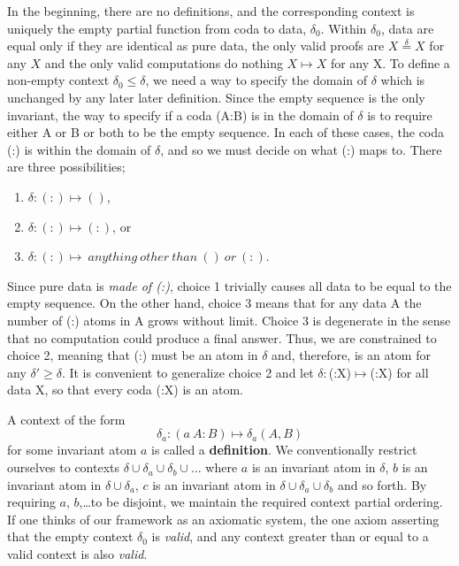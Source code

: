 \documentclass[11pt]{article}
\begin{document}
     In the beginning, there are no definitions, and the corresponding context is uniquely the empty partial function from coda to data, $\delta_0$.
 Within $\delta_0$, data are equal only if they are identical as 
 pure data, the only valid proofs are $X{\overset \delta =}X$ for any $X$ and the only valid computations do nothing $X\mapsto X$ for any X. 
To define a non-empty context $\delta_0\le\delta$, we need a way to specify the domain of $\delta$ which is unchanged by any later  
later definition.  Since the empty sequence is the only invariant, the way to specify if a coda (A:B) is in the domain of $\delta$ is 
to require either A or B or both to be the empty sequence. In each of these cases, the coda (:) is within the domain of $\delta$, and so we must decide on what (:) maps to.  
There are three possibilities; 
\begin{enumerate}
\item{$\delta: (:) \mapsto ()$},
\item{$\delta: (:) \mapsto (:)$}, or 
\item{$\delta: (:) \mapsto \ anything\ other\ than\ ()\ or\ (:)$}. 
\end{enumerate}
Since pure data is {\it made of (:)}, choice 1 trivially causes all data to be equal to the empty sequence. On the other hand, choice 3 means that for any data A the number of (:) atoms in A grows without limit.  Choice 3 is degenerate in the sense that no computation could produce a final answer.  Thus, we are constrained to choice 2, meaning that (:) must be an atom in $\delta$ and, therefore, is an atom for any $\delta'\ge\delta$.  
It is convenient to generalize choice 2 and let $\delta:$(:X)$\mapsto$(:X) for all data X, so that every coda (:X) is an atom.

A context of the form 
\begin{equation}
	\delta_a: (a\ A:B) \mapsto \delta_a(A,B)
\end{equation}
for some invariant atom $a$ is called a {\bf definition}.  We conventionally restrict ourselves to 
contexts $\delta\cup\delta_a\cup\delta_b\cup\dots$ where $a$ is an invariant atom in $\delta$, $b$ is an invariant atom in $\delta\cup\delta_a$, $c$ is an invariant atom in $\delta\cup\delta_a\cup\delta_b$ and so forth.  By requiring $a$, $b$,\dots to be disjoint, we maintain the required context partial ordering.  If one thinks of our framework as an axiomatic system, the one axiom asserting that the empty context $\delta_0$ is {\it valid}, and any context greater than or equal to a valid context is also {\it valid}. 
\end{document}
